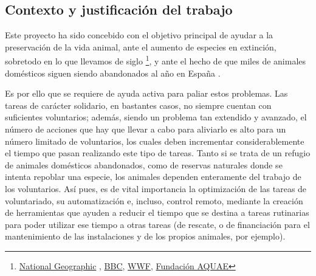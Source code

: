 \documentclass[12pt]{article}
\begin{document}
	
	\subsection[Contexto y justificación del trabajo]{Contexto y justificación del trabajo}

	\noindent Este proyecto ha sido concebido con el objetivo principal de ayudar a la preservación de la vida animal, ante el aumento de especies en extinción, sobretodo en lo que llevamos de siglo \footnote{\href{https://www.nationalgeographic.com.es/naturaleza/grandes-reportajes/animales-peligro-extincion_12536}{National Geographic} , \href{https://www.bbc.com/mundo/noticias-54036796}{BBC}, \href{https://www.worldwildlife.org/descubre-wwf/historias/que-significa-especie-en-peligro-de-extincion}{WWF}, \href{https://www.fundacionaquae.org/causas-perdida-biodiversidad/}{Fundación AQUAE}}, y ante el hecho de que miles de animales domésticos siguen siendo abandonados al año en España \footnotemark. \\
	

	\noindent Es por ello que se requiere de ayuda activa para paliar estos problemas. Las tareas de carácter solidario, en bastantes casos, no siempre cuentan con suficientes voluntarios; además, siendo un problema tan extendido y avanzado, el número de acciones que hay que llevar a cabo para aliviarlo es alto para un número limitado de voluntarios, los cuales deben incrementar considerablemente el tiempo que pasan realizando este tipo de tareas. 
	Tanto si se trata de un refugio de animales domésticos abandonados, como de reservas naturales donde se intenta repoblar una especie, los animales dependen enteramente del trabajo de los voluntarios. Así pues, es de vital importancia la optimización de las tareas de voluntariado, su automatización e, incluso, control remoto, mediante la creación de herramientas que ayuden a reducir el tiempo que se destina a tareas rutinarias para poder utilizar ese tiempo a otras tareas (de rescate, o de financiación para el mantenimiento de las instalaciones y de los propios animales, por ejemplo). \\
	
\end{document}
